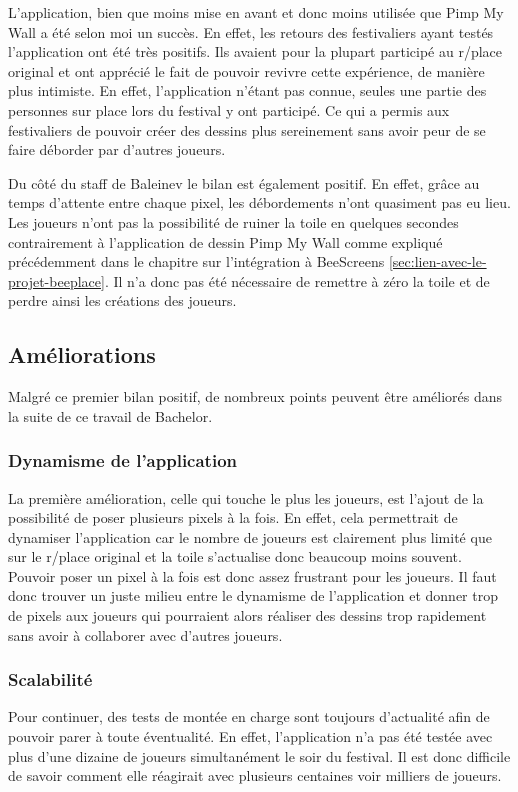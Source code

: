 L'application, bien que moins mise en avant et donc moins utilisée que Pimp My Wall a été selon moi un succès. En effet, les retours des festivaliers ayant testés l'application ont été très positifs. Ils avaient pour la plupart participé au r/place original et ont apprécié le fait de pouvoir revivre cette expérience, de manière plus intimiste. En effet, l'application n'étant pas connue, seules une partie des personnes sur place lors du festival y ont participé. Ce qui a permis aux festivaliers de pouvoir créer des dessins plus sereinement sans avoir peur de se faire déborder par d'autres joueurs.

Du côté du staff de Baleinev le bilan est également positif. En effet, grâce au temps d'attente entre chaque pixel, les débordements n'ont quasiment pas eu lieu. Les joueurs n'ont pas la possibilité de ruiner la toile en quelques secondes contrairement à l'application de dessin Pimp My Wall comme expliqué précédemment dans le chapitre sur l'intégration à BeeScreens \ref{sec:lien-avec-le-projet-beeplace}. Il n'a donc pas été nécessaire de remettre à zéro la toile et de perdre ainsi les créations des joueurs.

\subsection{Améliorations}
\label{poc-ameliorations}

Malgré ce premier bilan positif, de nombreux points peuvent être améliorés dans la suite de ce travail de Bachelor.

\subsubsection{Dynamisme de l'application}
La première amélioration, celle qui touche le plus les joueurs, est l'ajout de la possibilité de poser plusieurs pixels à la fois. En effet, cela permettrait de dynamiser l'application car le nombre de joueurs est clairement plus limité que sur le r/place original et la toile s'actualise donc beaucoup moins souvent. Pouvoir poser un pixel à la fois est donc assez frustrant pour les joueurs. Il faut donc trouver un juste milieu entre le dynamisme de l'application et donner trop de pixels aux joueurs qui pourraient alors réaliser des dessins trop rapidement sans avoir à collaborer avec d'autres joueurs.

\subsubsection{Scalabilité}
Pour continuer, des tests de montée en charge sont toujours d'actualité afin de pouvoir parer à toute éventualité. En effet, l'application n'a pas été testée avec plus d'une dizaine de joueurs simultanément le soir du festival. Il est donc difficile de savoir comment elle réagirait avec plusieurs centaines voir milliers de joueurs.

